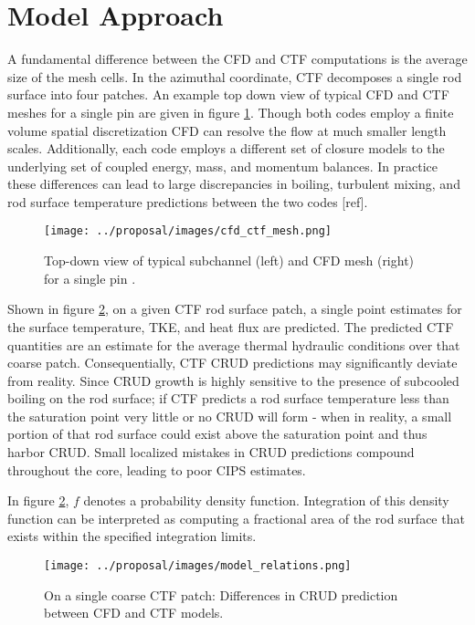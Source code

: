 
\section{Model Approach}

A fundamental difference between the CFD and CTF computations is the average size of the mesh cells.  In the azimuthal coordinate, CTF decomposes a single rod surface into four patches.  An example top down view of typical CFD and CTF meshes for a single pin are given in figure \ref{fig:cfd_ctf_mesh}.  Though both codes employ a finite volume spatial discretization CFD can resolve the flow at much smaller length scales.  Additionally, each code employs a different set of closure models to the underlying set of coupled energy, mass, and momentum balances.  In practice these differences can lead to large discrepancies in boiling, turbulent mixing, and rod surface temperature predictions between the two codes [ref].

\begin{figure}[!htbp]
    \centering
    \texttt{[image: ../proposal/images/cfd\_ctf\_mesh.png]}
    \caption[Top-down view of typical subchannel and CFD meshes]{Top-down view of typical subchannel (left) and CFD mesh (right) for a single pin \cite{salko12}.}
    \label{fig:cfd_ctf_mesh}
\end{figure}

Shown in figure \ref{fig:model_overview}, on a given CTF rod surface patch, a single point estimates for the surface temperature, TKE, and heat flux are predicted.  The predicted CTF quantities are an estimate for the average thermal hydraulic conditions over that coarse patch.   Consequentially, CTF CRUD predictions may significantly deviate from reality.  Since CRUD growth is highly sensitive to the presence of subcooled boiling on the rod surface; if CTF predicts a rod surface temperature less than the saturation point very little or no CRUD will form - when in reality, a small portion of that rod surface could exist above the saturation point and thus harbor CRUD.  Small localized mistakes in CRUD predictions compound throughout the core, leading to poor CIPS estimates. 

In figure \ref{fig:model_overview}, $f$ denotes a probability density function.  Integration of this density function can be interpreted as computing a fractional area of the rod surface that exists within the specified integration limits.  
\begin{figure}[!htbp]
    \centering
    \texttt{[image: ../proposal/images/model\_relations.png]}
    \caption{On a single coarse CTF patch: Differences in CRUD prediction between CFD and CTF models.}
    \label{fig:model_overview}
\end{figure}

